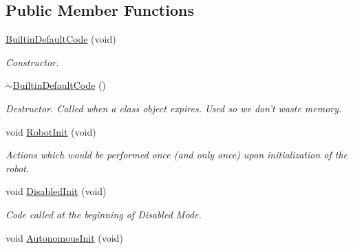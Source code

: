 \subsection*{Public Member Functions}
\begin{DoxyCompactItemize}
\item 
\hyperlink{class_builtin_default_code_a5f72b929d98fe4193e1a7d8e351a7837}{BuiltinDefaultCode} (void)
\begin{DoxyCompactList}\small\item\em Constructor. \item\end{DoxyCompactList}\item 
\hypertarget{class_builtin_default_code_a04c696dab5af274ca086d8903eb02134}{
\hyperlink{class_builtin_default_code_a04c696dab5af274ca086d8903eb02134}{$\sim$BuiltinDefaultCode} ()}
\label{class_builtin_default_code_a04c696dab5af274ca086d8903eb02134}

\begin{DoxyCompactList}\small\item\em Destructor. Called when a class object expires. Used so we don't waste memory. \item\end{DoxyCompactList}\item 
\hypertarget{class_builtin_default_code_a522b7e1b11f160868900a01a7f5609b6}{
void \hyperlink{class_builtin_default_code_a522b7e1b11f160868900a01a7f5609b6}{RobotInit} (void)}
\label{class_builtin_default_code_a522b7e1b11f160868900a01a7f5609b6}

\begin{DoxyCompactList}\small\item\em Actions which would be performed once (and only once) upon initialization of the robot. \item\end{DoxyCompactList}\item 
\hypertarget{class_builtin_default_code_a1df5e366a588086aedab2510393a9ac6}{
void \hyperlink{class_builtin_default_code_a1df5e366a588086aedab2510393a9ac6}{DisabledInit} (void)}
\label{class_builtin_default_code_a1df5e366a588086aedab2510393a9ac6}

\begin{DoxyCompactList}\small\item\em Code called at the beginning of Disabled Mode. \item\end{DoxyCompactList}\item 
\hypertarget{class_builtin_default_code_a727ebabf0678af822d53f90f96bfd679}{
void \hyperlink{class_builtin_default_code_a727ebabf0678af822d53f90f96bfd679}{AutonomousInit} (void)}
\label{class_builtin_default_code_a727ebabf0678af822d53f90f96bfd679}


\end{DoxyCompactItemize}
